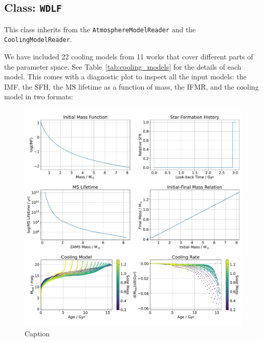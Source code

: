 \documentclass[fleqn,usenatbib]{rasti}
\begin{document}
\subsection{Class: \texttt{WDLF}}
This class inherits from the \verb+AtmosphereModelReader+ and the
\verb+CoolingModelReader+.


We have included 22 cooling models from 11 works that cover different parts of
the parameter space. See Table~\ref{tab:cooling_models} for the details of
each model. This comes with a diagnostic plot to inspect all the input models:
the IMF, the SFH, the MS lifetime as a function of mass, the IFMR, and the
cooling model in two formats: 

\begin{figure}
    \centering
    \includegraphics[width=\textwidth]{input_model.pdf}
    \caption{Caption}
    \label{fig:input_model}
\end{figure}
\end{document}
